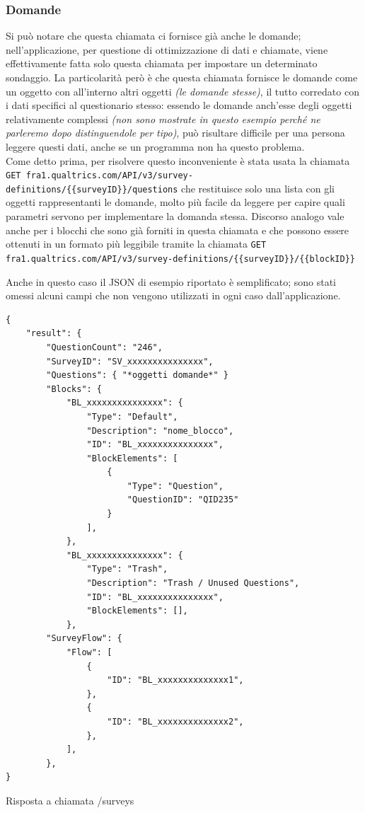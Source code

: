 \subsubsection{Domande}
Si può notare che questa chiamata ci fornisce già anche le domande; nell'applicazione, per questione di ottimizzazione di dati e chiamate, viene effettivamente fatta solo questa chiamata per impostare un determinato sondaggio. La particolarità però è che questa chiamata fornisce le domande come un oggetto con all'interno altri oggetti \textit{(le domande stesse)}, il tutto corredato con i dati specifici al questionario stesso: essendo le domande anch'esse degli oggetti relativamente complessi \textit{(non sono mostrate in questo esempio perché ne parleremo dopo distinguendole per tipo)}, può risultare difficile per una persona leggere questi dati, anche se un programma non ha questo problema. \\ Come detto prima, per risolvere questo inconveniente è stata usata la chiamata \\ \texttt{GET fra1.qualtrics.com/API/v3/survey-definitions/\{\{surveyID\}\}/questions} che restituisce solo una lista con gli oggetti rappresentanti le domande, molto più facile da leggere per capire quali parametri servono per implementare la domanda stessa.
Discorso analogo vale anche per i blocchi che sono già forniti in questa chiamata e che possono essere ottenuti in un formato più leggibile tramite la chiamata \texttt{GET fra1.qualtrics.com/API/v3/survey-definitions/\{\{surveyID\}\}/\{\{blockID\}\}}

Anche in questo caso il JSON di esempio riportato è semplificato; sono stati omessi alcuni campi che non vengono utilizzati in ogni caso dall'applicazione.

\newpage
\begin{json}
\begin{verbatim}
{
    "result": {
        "QuestionCount": "246",
        "SurveyID": "SV_xxxxxxxxxxxxxxx",
        "Questions": { "*oggetti domande*" }
        "Blocks": {
            "BL_xxxxxxxxxxxxxxx": {
                "Type": "Default",
                "Description": "nome_blocco",
                "ID": "BL_xxxxxxxxxxxxxxx",
                "BlockElements": [
                    {
                        "Type": "Question",
                        "QuestionID": "QID235"
                    }
                ],
            },
            "BL_xxxxxxxxxxxxxxx": {
                "Type": "Trash",
                "Description": "Trash / Unused Questions",
                "ID": "BL_xxxxxxxxxxxxxxx",
                "BlockElements": [],
            },
        "SurveyFlow": {
            "Flow": [
                {
                    "ID": "BL_xxxxxxxxxxxxxx1",
                },
                {
                    "ID": "BL_xxxxxxxxxxxxxx2",
                },
            ],
        },
}
\end{verbatim}
\caption{Risposta a chiamata /surveys}
\label{json:surveyID}
\end{json}

